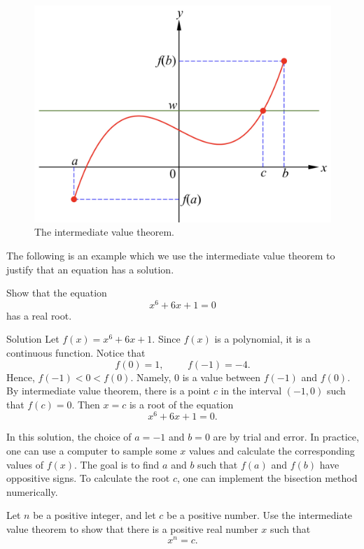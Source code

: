 \begin{example}
 \begin{figure}[ht]
\centering
\includegraphics[scale=0.2]{Picture12.png}
\caption{The  intermediate value theorem.}\label{figure12}
\end{figure}
The following is an example which we use the intermediate value theorem to justify that an equation has a solution.
\begin{example}[label=ex230215_1]{}
Show that the equation 
\[x^6+6x+1=0\]has a real root.
\end{example}
\begin{solution}{Solution}
Let $f(x)=x^6+6x+1$.
Since $f(x)$ is a polynomial, it is a continuous function. Notice that
\[f(0)=1,\hspace{1cm}f(-1)=-4.\]
Hence, $f(-1)<0<f(0)$. Namely, $0$ is a value between $f(-1)$ and $f(0)$. By intermediate value theorem, there is a point $c$ in the interval $(-1,0)$ such that $f(c)=0$. Then $x=c$ is a root of the equation\[x^6+6x+1=0.\]
\end{solution}In this solution, the choice of $a=-1$ and $b=0$ are by trial and error. In practice, one can use a computer to sample some $x$ values and calculate the corresponding values of $f(x)$. The goal is to find   $a$ and   $b$ such that $f(a)$ and $f(b)$ have oppositive signs. To calculate the root $c$, one can implement the bisection method numerically.

\begin{example}{}
Let $n$ be a positive integer, and let $c$ be a positive number. Use the intermediate value theorem to show that there is a positive real number $x$ such that
\[x^n=c.\]
\end{example}


\end{example}
